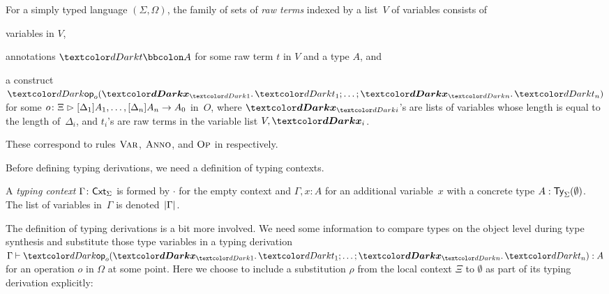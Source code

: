 \begin{defn}
  For a simply typed language $(\Sigma, \Omega)$, the family of sets of \emph{raw terms} indexed by a list~$V$ of variables consists of
  \begin{inlineenum}
    \item variables in $V$,
    \item annotations $\isTerm{t \annotate A}$ for some raw term $t$ in $V$ and a type $A$, and
    \item a construct $\tmOpts$ for some $o\colon \Xi \mathrel{\rhd} [\Delta_{1}]A_{1}, \ldots, [\Delta_{n}]A_{n} \to A_0$ in~$O$, where $\vars{x}_{\isTerm{i}}$'s are lists of variables whose length is equal to the length of~$\Delta_i$, and $t_i$'s are raw terms in the variable list $V, \vars{x}_i$.
  \end{inlineenum}
  These correspond to rules $\textnormal{\textsc{Var}}$, $\textnormal{\textsc{Anno}}$, and $\textnormal{\textsc{Op}}$ in  respectively.
\end{defn}

Before defining typing derivations, we need a definition of typing contexts.

\begin{defn}
A \emph{typing context} $\Gamma \colon \mathsf{Cxt}_{\Sigma}$ is formed by $\cdot$ for the empty context and $\Gamma, x : A$ for an additional variable~$x$ with a concrete type $A : \mathsf{Ty}_{\Sigma}(\emptyset)$.
The list of variables in~$\Gamma$ is denoted~$\left|\Gamma\right|$.
\end{defn}

The definition of typing derivations is a bit more involved.
We need some information to compare types on the object level during type synthesis and substitute those type variables in a typing derivation $\Gamma \vdash \tmOpts : A$ for an operation $o$ in $\Omega$ at some point.
Here we choose to include a substitution $\rho$ from the local context $\Xi$ to $\emptyset$ as part of its typing derivation explicitly:

